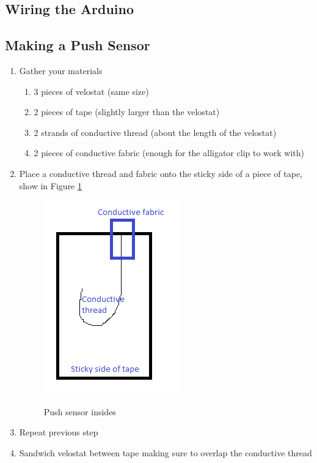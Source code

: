 \documentclass[12pt,letterpaper,oneside]{article}
\begin{document}
	\subsection{Wiring the Arduino} \label{sec:wire}
	
	
	\subsection{Making a Push Sensor}
		\begin{enumerate}
				\item Gather your materials
					\begin{enumerate}
						\item 3 pieces of velostat (same size)
						\item 2 pieces of tape (slightly larger than the velostat)
						\item 2 strands of conductive thread (about the length of the velostat)
						\item 2 pieces of conductive fabric (enough for the alligator clip to work with)
					\end{enumerate}
				\item Place a conductive thread and fabric onto the sticky side of a piece of tape, show in Figure \ref{fig:stickyTape}
					\begin{figure} [here]
						\centering
						\caption{Push sensor insides}
						\includegraphics[scale=.6]{sensor.png}		
						\label{fig:stickyTape}
					\end{figure}	
				\item Repeat previous step
				\item Sandwich velostat between tape making sure to overlap the conductive thread
		\end{enumerate}						
\end{document}
